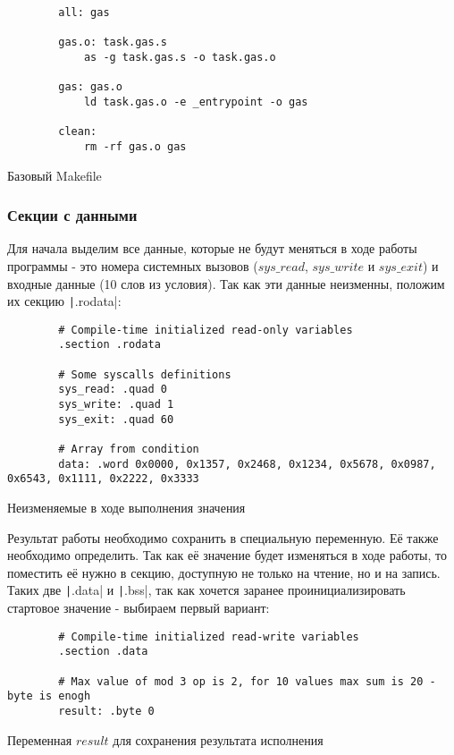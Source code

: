 \documentclass[a4paper]{article}
\begin{document}
  \begin{listing}[H]
    \begin{verbatim}
        all: gas

        gas.o: task.gas.s
            as -g task.gas.s -o task.gas.o

        gas: gas.o
            ld task.gas.o -e _entrypoint -o gas

        clean:
            rm -rf gas.o gas
    \end{verbatim}
    \caption{Базовый Makefile}
  \end{listing}

  \subsubsection{Секции с данными}

  Для начала выделим все данные, которые не будут меняться в ходе
  работы программы - это номера системных вызовов ($sys\_read$, $sys\_write$
  и $sys\_exit$) и входные данные (10 слов из условия). Так как эти данные 
  неизменны, положим их секцию \texttt|.rodata|:

  \begin{listing}[H]
    \begin{verbatim}
        # Compile-time initialized read-only variables
        .section .rodata
        
        # Some syscalls definitions
        sys_read: .quad 0 
        sys_write: .quad 1
        sys_exit: .quad 60
        
        # Array from condition
        data: .word 0x0000, 0x1357, 0x2468, 0x1234, 0x5678, 0x0987, 0x6543, 0x1111, 0x2222, 0x3333
    \end{verbatim}
    \caption{Неизменяемые в ходе выполнения значения}
  \end{listing}

  Результат работы необходимо сохранить в специальную переменную.
  Её также необходимо определить. Так как её значение будет изменяться
  в ходе работы, то поместить её нужно в секцию, доступную не только на чтение,
  но и на запись. Таких две \texttt|.data| и \texttt|.bss|,
  так как хочется заранее проинициализировать стартовое значение - 
  выбираем первый вариант:

  \begin{listing}[H]
    \begin{verbatim}
        # Compile-time initialized read-write variables
        .section .data
        
        # Max value of mod 3 op is 2, for 10 values max sum is 20 - byte is enogh
        result: .byte 0
    \end{verbatim}
    \caption{Переменная $result$ для сохранения результата исполнения}
  \end{listing}
\end{document}
